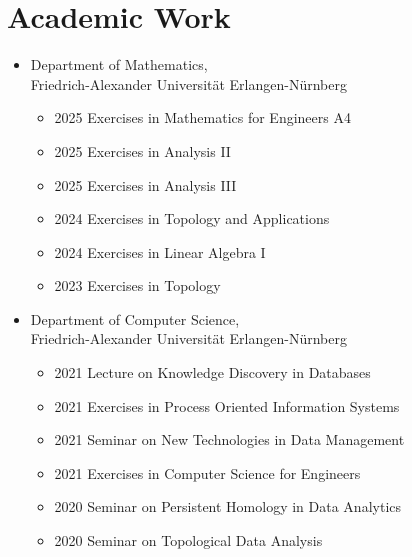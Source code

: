 \documentclass[a4paper, 11pt]{article}
\newcommand{\years}[1]{\marginnote{\scriptsize #1}}
\begin{document}
	\newpage
	\section*{Academic Work}
	\years{Teaching}
	\vspace{-2pt}
	\begin{itemize}[noitemsep, leftmargin=*]
		\item Department of Mathematics, \\ Friedrich-Alexander Universität Erlangen-Nürnberg
			\begin{itemize}
				\item 2025 Exercises in Mathematics for Engineers A4

				\item 2025 Exercises in Analysis II

				\item 2025 Exercises in Analysis III

				\item 2024 Exercises in Topology and Applications

				\item 2024 Exercises in Linear Algebra I

				\item 2023 Exercises in Topology
			\end{itemize}

		\item Department of Computer Science, \\ Friedrich-Alexander Universität
			Erlangen-Nürnberg
			\begin{itemize}
				\item 2021 Lecture on Knowledge Discovery in Databases

				\item 2021 Exercises in Process Oriented Information Systems

				\item 2021 Seminar on New Technologies in Data Management

				\item 2021 Exercises in Computer Science for Engineers

				\item 2020 Seminar on Persistent Homology in Data Analytics

				\item 2020 Seminar on Topological Data Analysis


\end{itemize}
\end{itemize}
\end{document}
